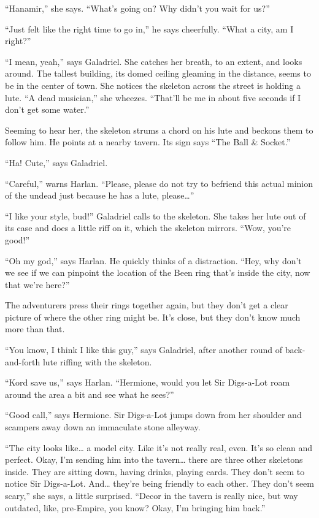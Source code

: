 \documentclass[smalldemyvopaper,11pt,twoside,onecolumn,openright,extrafontsizes]{memoir}
\begin{document}
``Hanamir,'' she says. ``What's going on? Why didn't you wait for us?''

``Just felt like the right time to go in,'' he says cheerfully. ``What a
city, am I right?''

``I mean, yeah,'' says Galadriel. She catches her breath, to an extent,
and looks around. The tallest building, its domed ceiling gleaming in
the distance, seems to be in the center of town. She notices the
skeleton across the street is holding a lute. ``A dead musician,'' she
wheezes. ``That'll be me in about five seconds if I don't get some
water.''

Seeming to hear her, the skeleton strums a chord on his lute and beckons
them to follow him. He points at a nearby tavern. Its sign says ``The
Ball \& Socket.''

``Ha! Cute,'' says Galadriel.

``Careful,'' warns Harlan. ``Please, please do not try to befriend this
actual minion of the undead just because he has a lute, please\ldots{}''

``I like your style, bud!'' Galadriel calls to the skeleton. She takes
her lute out of its case and does a little riff on it, which the
skeleton mirrors. ``Wow, you're good!''

``Oh my god,'' says Harlan. He quickly thinks of a distraction. ``Hey,
why don't we see if we can pinpoint the location of the Been ring that's
inside the city, now that we're here?''

The adventurers press their rings together again, but they don't get a
clear picture of where the other ring might be. It's close, but they
don't know much more than that.

``You know, I think I like this guy,'' says Galadriel, after another
round of back-and-forth lute riffing with the skeleton.

``Kord save us,'' says Harlan. ``Hermione, would you let Sir Digs-a-Lot
roam around the area a bit and see what he sees?''

``Good call,'' says Hermione. Sir Digs-a-Lot jumps down from her
shoulder and scampers away down an immaculate stone alleyway.

``The city looks like\ldots{} a model city. Like it's not really real,
even. It's so clean and perfect. Okay, I'm sending him into the
tavern\ldots{} there are three other skeletons inside. They are sitting
down, having drinks, playing cards. They don't seem to notice Sir
Digs-a-Lot. And\ldots{} they're being friendly to each other. They don't
seem scary,'' she says, a little surprised. ``Decor in the tavern is
really nice, but way outdated, like, pre-Empire, you know? Okay, I'm
bringing him back.''
\end{document}
